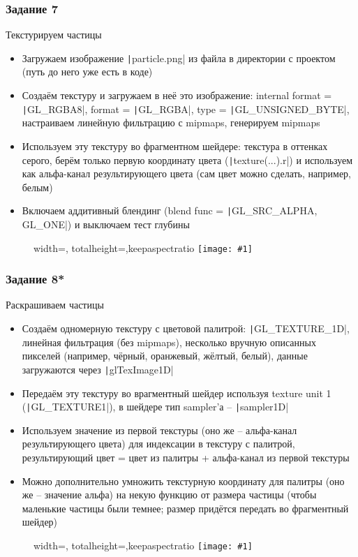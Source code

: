 \documentclass[10pt]{beamer}
\newcommand{\slideimage}[1]{
  \begin{figure}
    \begin{adjustbox}{width=\textwidth, totalheight=\textheight-2\baselineskip-2\baselineskip,keepaspectratio}
      \texttt{[image: \#1]}
    \end{adjustbox}
  \end{figure}
}
\begin{document}
\begin{frame}[fragile]
\frametitle{Задание 7}
Текстурируем частицы
\begin{itemize}
\item Загружаем изображение \texttt|particle.png| из файла в директории с проектом (путь до него уже есть в коде)
\item Создаём текстуру и загружаем в неё это изображение: internal format = \texttt|GL_RGBA8|, format = \texttt|GL_RGBA|, type = \texttt|GL_UNSIGNED_BYTE|, настраиваем линейную фильтрацию с mipmaps, генерируем mipmaps
\item Используем эту текстуру во фрагментном шейдере: текстура в оттенках серого, берём только первую координату цвета (\texttt|texture(...).r|) и используем как альфа-канал результирующего цвета (сам цвет можно сделать, например, белым)
\item Включаем аддитивный блендинг (blend func = \texttt|GL_SRC_ALPHA, GL_ONE|) и выключаем тест глубины
\end{itemize}
\end{frame}

\begin{frame}[fragile]
\slideimage{7.png}
\end{frame}

\begin{frame}[fragile]
\frametitle{Задание 8*}
\begin{footnotesize}
Раскрашиваем частицы
\begin{itemize}
\item Создаём одномерную текстуру с цветовой палитрой: \texttt|GL_TEXTURE_1D|, линейная фильтрация (без mipmaps), несколько вручную описанных пикселей (например, чёрный, оранжевый, жёлтый, белый), данные загружаются через \texttt|glTexImage1D|
\item Передаём эту текстуру во врагментный шейдер используя texture unit 1 (\texttt|GL_TEXTURE1|), в шейдере тип sampler'а -- \texttt|sampler1D|
\item Используем значение из первой текстуры (оно же -- альфа-канал результирующего цвета) для индексации в текстуру с палитрой, результирующий цвет = цвет из палитры + альфа-канал из первой текстуры
\item Можно дополнительно умножить текстурную координату для палитры (оно же -- значение альфа) на некую функцию от размера частицы (чтобы маленькие частицы были темнее; размер придётся передать во фрагментный шейдер)
\end{itemize}
\end{footnotesize}
\end{frame}

\begin{frame}[fragile]
\slideimage{8.png}
\end{frame}
\end{document}
